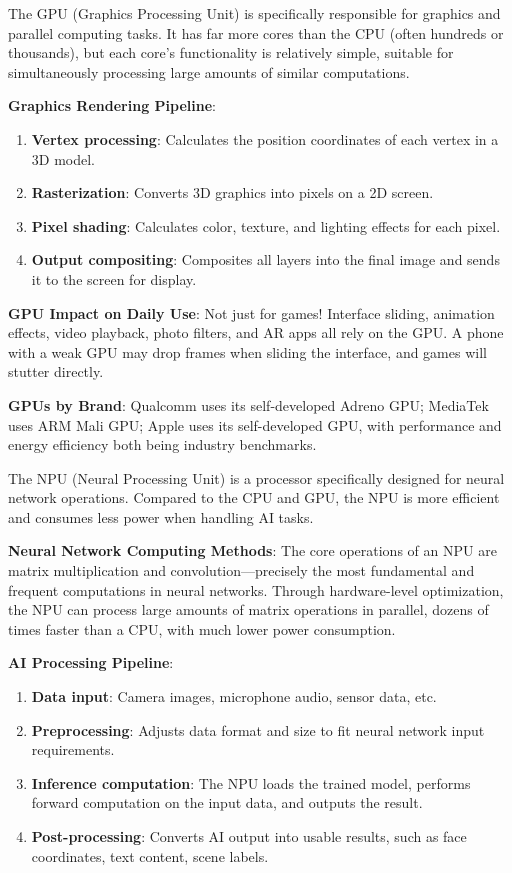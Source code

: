 
The GPU (Graphics Processing Unit) is specifically responsible for graphics and parallel computing tasks. It has far more cores than the CPU (often hundreds or thousands), but each core's functionality is relatively simple, suitable for simultaneously processing large amounts of similar computations.

\textbf{Graphics Rendering Pipeline}:

\begin{enumerate}
  \item \textbf{Vertex processing}: Calculates the position coordinates of each vertex in a 3D model.
  \item \textbf{Rasterization}: Converts 3D graphics into pixels on a 2D screen.
  \item \textbf{Pixel shading}: Calculates color, texture, and lighting effects for each pixel.
  \item \textbf{Output compositing}: Composites all layers into the final image and sends it to the screen for display.
\end{enumerate}

\textbf{GPU Impact on Daily Use}: Not just for games! Interface sliding, animation effects, video playback, photo filters, and AR apps all rely on the GPU. A phone with a weak GPU may drop frames when sliding the interface, and games will stutter directly.

\textbf{GPUs by Brand}: Qualcomm uses its self-developed Adreno GPU; MediaTek uses ARM Mali GPU; Apple uses its self-developed GPU, with performance and energy efficiency both being industry benchmarks.


The NPU (Neural Processing Unit) is a processor specifically designed for neural network operations. Compared to the CPU and GPU, the NPU is more efficient and consumes less power when handling AI tasks.

\textbf{Neural Network Computing Methods}: The core operations of an NPU are matrix multiplication and convolution—precisely the most fundamental and frequent computations in neural networks. Through hardware-level optimization, the NPU can process large amounts of matrix operations in parallel, dozens of times faster than a CPU, with much lower power consumption.

\textbf{AI Processing Pipeline}:

\begin{enumerate}
  \item \textbf{Data input}: Camera images, microphone audio, sensor data, etc.
  \item \textbf{Preprocessing}: Adjusts data format and size to fit neural network input requirements.
  \item \textbf{Inference computation}: The NPU loads the trained model, performs forward computation on the input data, and outputs the result.
  \item \textbf{Post-processing}: Converts AI output into usable results, such as face coordinates, text content, scene labels.
\end{enumerate}

